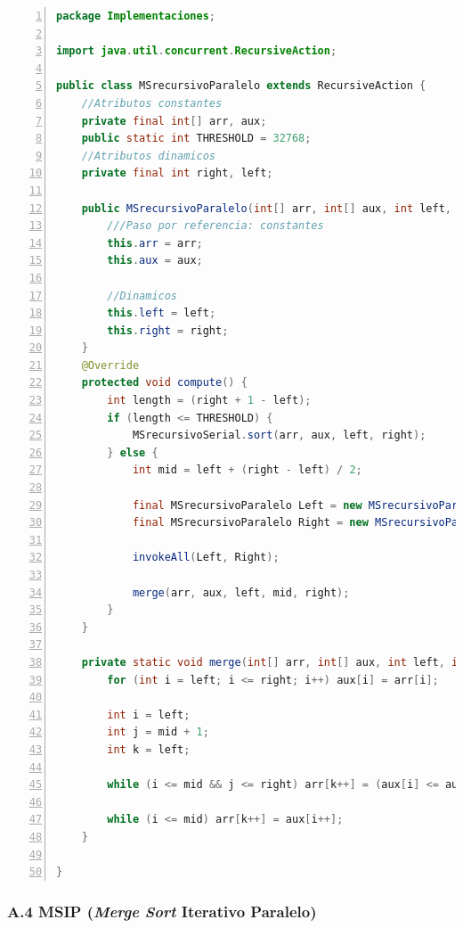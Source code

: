 \documentclass[titlepage]{article}
\begin{document}
	\begin{lstlisting}[language=java, frame=single, numbers=left, float=h]
package Implementaciones;

import java.util.concurrent.RecursiveAction;

public class MSrecursivoParalelo extends RecursiveAction {
	//Atributos constantes
	private final int[] arr, aux;
	public static int THRESHOLD = 32768;
	//Atributos dinamicos
	private final int right, left;
	
	public MSrecursivoParalelo(int[] arr, int[] aux, int left, int right){
		///Paso por referencia: constantes
		this.arr = arr;
		this.aux = aux;
		
		//Dinamicos
		this.left = left;
		this.right = right;
	}
	@Override
	protected void compute() {
		int length = (right + 1 - left);
		if (length <= THRESHOLD) {
			MSrecursivoSerial.sort(arr, aux, left, right);
		} else {
			int mid = left + (right - left) / 2;
			
			final MSrecursivoParalelo Left = new MSrecursivoParalelo(arr, aux, left, mid);
			final MSrecursivoParalelo Right = new MSrecursivoParalelo(arr, aux, mid+1, right);
			
			invokeAll(Left, Right);
			
			merge(arr, aux, left, mid, right);
		}
	}
	
	private static void merge(int[] arr, int[] aux, int left, int mid, int right) {
		for (int i = left; i <= right; i++) aux[i] = arr[i];
		
		int i = left;       
		int j = mid + 1;    
		int k = left;       
		
		while (i <= mid && j <= right) arr[k++] = (aux[i] <= aux[j])? aux[i++] : aux[j++];
		
		while (i <= mid) arr[k++] = aux[i++];
	}
	
}
	\end{lstlisting}


\newpage
\subsubsection*{A.4 MSIP (\textit{Merge Sort} Iterativo Paralelo)}
\end{document}
